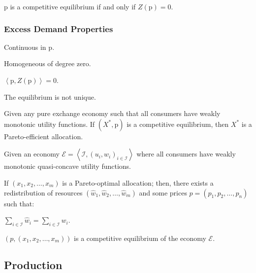 \documentclass[8pt,a4paper]{extarticle}
\begin{document}
\begin{multicols}{3}
  \begin{boxprop}
    $\mathrm{p}$ is a competitive equilibrium if and only if $Z(\mathrm{p}) = 0$.
  \end{boxprop}

  \sectionbreak

  \subsubsection*{Excess Demand Properties}

  \begin{eqlist}
    \item Continuous in $\mathrm{p}$.
    \item Homogeneous of degree zero.
    \item $\left\langle \mathrm{p},Z(\mathrm{p}) \right\rangle = 0$.
  \end{eqlist}

  \begin{boxprop}
    The equilibrium is not unique.
  \end{boxprop}

  \begin{boxtheo}[Welfare I]
    Given any pure exchange economy such that all consumers have weakly monotonic utility functions. If $(X^*,\mathrm{p})$ is a competitive equilibrium, then $X^*$ is a Pareto-efficient allocation.
  \end{boxtheo}

  \begin{boxtheo}[Welfare II]
    Given an economy $\displaystyle \mathcal{E} = \left\langle \mathcal{I}, (u_i, w_i)_{i \in \mathcal{I}} \right\rangle$ where all consumers have weakly monotonic quasi-concave utility functions. \par
    If $(x_1, x_2, \ldots, x_m)$ is a Pareto-optimal allocation; then, there exists a redistribution of resources $(\hat{w}_1, \hat{w}_2, \ldots, \hat{w}_m)$ and some prices $p = (p_1, p_2, \ldots, p_n)$ such that:
    \begin{eqlist}
      \item $\displaystyle \sum_{i \in \mathcal{I}} \hat{w}_i = \sum_{i \in \mathcal{I}} w_i$.
      \item $(p, (x_1, x_2, \ldots, x_m))$ is a competitive equilibrium of the economy $\mathcal{E}$.
    \end{eqlist}
  \end{boxtheo}

  \newpage

  \subsection{Production}


\end{multicols}
\end{document}
